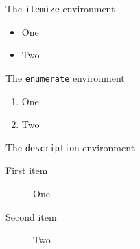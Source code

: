 \documentclass{article}
\begin{document}
\noindent
The \texttt{itemize} environment
\begin{itemize}
    \item One
    \item Two
\end{itemize}

\medskip\noindent
The \texttt{enumerate} environment
\begin{enumerate}
    \item One
    \item Two
\end{enumerate}

\medskip\noindent
The \texttt{description} environment
\begin{description}
    \item[First item] One
    \item[Second item] Two
\end{description}
\end{document}
